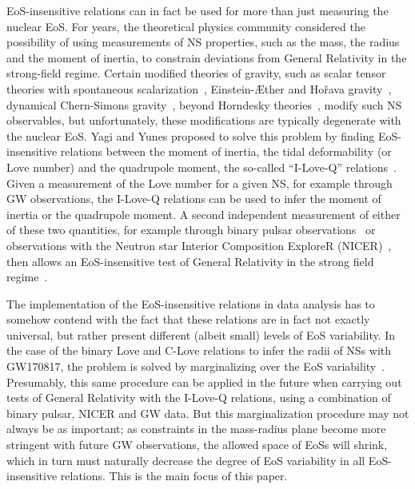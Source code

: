 \documentclass[prd,twocolumn,nofootinbib,superscriptaddress,amsmath,amssymb]{revtex4-1}
\begin{document}
EoS-insensitive relations can in fact be used for more than just measuring the nuclear EoS. For years, the theoretical physics community considered the possibility of using measurements of NS properties, such as the mass, the radius and the moment of inertia, to constrain deviations from General Relativity in the strong-field regime. Certain modified theories of gravity, such as scalar tensor theories with spontaneous scalarization~\cite{Damour:1996ke}, Einstein-\AE ther and Ho\v rava gravity~\cite{Eling:2007xh,Yagi:2013ava,Yagi:2013qpa}, dynamical Chern-Simons gravity~\cite{Yunes:2009ch,Yagi:2013mbt,Gupta:2017vsl}, beyond Horndesky theories~\cite{Babichev:2016jom,Sakstein:2016oel}, modify such NS observables, but unfortunately, these modifications are typically degenerate with the nuclear EoS. Yagi and Yunes proposed to solve this problem by finding EoS-insensitive relations between the moment of inertia, the tidal deformability (or Love number) and the quadrupole moment, the so-called ``I-Love-Q'' relations~\cite{Yagi:2013bca,Yagi:ILQ}. Given a measurement of the Love number for a given NS, for example through GW observations, the I-Love-Q relations can be used to infer the moment of inertia or the quadrupole moment. A second independent measurement of either of these two quantities, for example through binary pulsar observations~\cite{Lattimer:2004nj} or observations with the Neutron star Interior Composition ExploreR (NICER)~\cite{Ozel:2015ykl}, then allows an EoS-insensitive test of General Relativity in the strong field regime~\cite{Yagi:2013bca,Yagi:ILQ,Gupta:2017vsl,Doneva:2017jop}. 

The implementation of the EoS-insensitive relations in data analysis has to somehow contend with the fact that these relations are in fact not exactly universal, but rather present different (albeit small) levels of EoS variability. In the case of the binary Love and C-Love relations to infer the radii of NSs with GW170817, the problem is solved by marginalizing over the EoS variability~\cite{Katerina:residuals}. Presumably, this same procedure can be applied in the future when carrying out tests of General Relativity with the I-Love-Q relations, using a combination of binary pulsar, NICER and GW data. But this marginalization procedure may not always be as important; as constraints in the mass-radius plane become more stringent with future GW observations, the allowed space of EoSs will shrink, which in turn must naturally decrease the degree of EoS variability in all EoS-insensitive relations. This is the main focus of this paper.  
\end{document}
